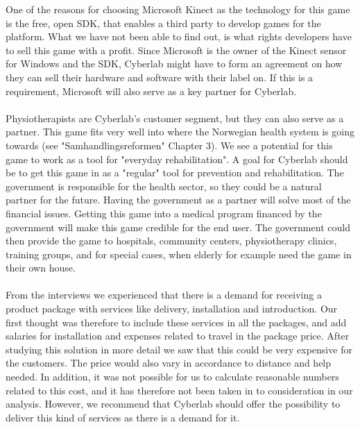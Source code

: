 One of the reasons for choosing Microsoft Kinect as the technology for this game is the free, open SDK, that enables a third party to develop games for the platform. What we have not been able to find out, is what rights developers have to sell this game with a profit. Since Microsoft is the owner of the Kinect sensor for Windows and the SDK, Cyberlab might have to form an agreement on how they can sell their hardware and software with their label on. If this is a requirement, Microsoft will also serve as a key partner for Cyberlab. \\ \\
Physiotherapists are Cyberlab's customer segment, but they can also serve as a partner. This game fits very well into where the Norwegian health system is going towards (see "Samhandlingsreformen" Chapter 3). We see a potential for this game to work as a tool for "everyday rehabilitation". A goal for Cyberlab should be to get this game in as a "regular" tool for prevention and rehabilitation. The government is responsible for the health sector, so they could be a natural partner for the future. Having the government as a partner will solve most of the financial issues. Getting this game into a medical program financed by the government will make this game credible for the end user. The government could then provide the game to hospitals, community centers, physiotherapy clinics, training groups, and for special cases, when elderly for example need the game in their own house. \\ \\ 
From the interviews we experienced that there is a demand for receiving a product package with services like delivery, installation and introduction. Our first thought was therefore to include these services in all the packages, and add salaries for installation and expenses related to travel in the package price. After studying this solution in more detail we saw that this could be very expensive for the customers. The price would also vary in accordance to distance and help needed. In addition, it was not possible for us to calculate reasonable numbers related to this cost, and it has therefore not been taken in to consideration in our analysis. However, we recommend that Cyberlab should offer the possibility to deliver this kind of services as there is a demand for it. \\ \\   
